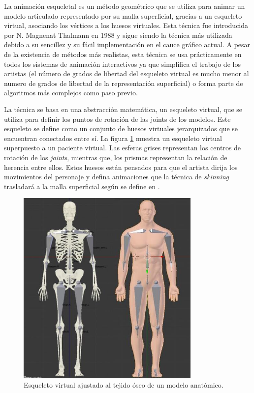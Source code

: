La animación esqueletal es un método geométrico que se utiliza para animar un modelo articulado representado por su malla superficial, gracias a un esqueleto virtual, asociando los vértices a los huesos virtuales. %
Esta técnica fue introducida por N. Magnenat Thalmann en 1988 \cite{thalmann88} y sigue siendo la técnica más utilizada debido a su sencillez y su fácil implementación en el cauce gráfico actual. A pesar de la existencia de métodos más realistas, esta técnica se usa prácticamente en todos los sistemas de animación interactivos ya que simplifica el trabajo de los artistas (el número de grados de libertad del esqueleto virtual es mucho menor al numero de grados de libertad de la representación superficial) o forma parte de algoritmos más complejos como paso previo. %

La técnica se basa en una abstracción matemática, un esqueleto virtual, que se utiliza para definir los puntos de rotación de las \ac{joints} de los modelos. Este esqueleto se define como un conjunto de huesos virtuales jerarquizados que se encuentran conectados entre sí. La figura \ref{fig:virtualskeleton} muestra un esqueleto virtual superpuesto a un paciente virtual. Las esferas grises representan los centros de rotación de los \emph{\acs{joints}}, mientras que, los prismas representan la relación de herencia entre ellos. Estos huesos están pensados para que el artista dirija los movimientos del personaje y defina animaciones que la técnica de \emph{skinning} trasladará a la malla superficial según se define en \cite{thalmann88}. 

\begin{figure}[ht]
   \centering
    \includegraphics[width=0.8\textwidth]{IMG/virtualskeleton.png}
    \caption{Esqueleto virtual ajustado al tejido óseo de un modelo anatómico.}
   \label{fig:virtualskeleton}
\end{figure}

